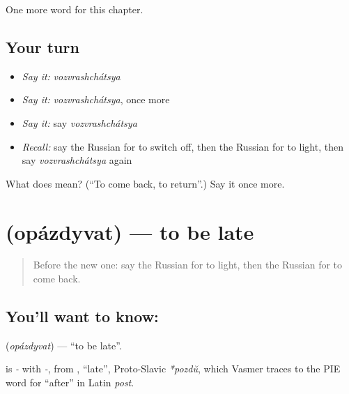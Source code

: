 \begin{grammarlens}[title={What you've built}]
One more word for this chapter.
\end{grammarlens}

\subsection*{Your turn}
\begin{itemize}
\raggedright
  \item \emph{Say it:} \emph{vozvrashchátsya}
  \item \emph{Say it:} \emph{vozvrashchátsya}, once more
  \item \emph{Say it:} say \emph{vozvrashchátsya}
  \item \emph{Recall:} say the Russian for to switch off, then the Russian for to light, then say \emph{vozvrashchátsya} again
\end{itemize}

\begin{tcolorbox}[breakable,colback=teal!4,colframe=teal!35!black,title={Before you move on}]
What does  mean? (\textquotedblleft{}To come back, to return\textquotedblright{}.) Say it once more.
\end{tcolorbox}
\section[\texorpdfstring{\ru{опаздывать} (opázdyvat)}{опаздывать (opázdyvat)}]{ (opázdyvat) — to be late}

\label{lesson:RU-C176-opazdyvat}



\begin{quote}
Before the new one: say the Russian for to light, then the Russian for to come back.
\end{quote}

\subsection*{You'll want to know: }
\textbf{} (\emph{opázdyvat}) — \textquotedblleft{}to be late\textquotedblright{}.

\begin{cousinweb}
\textbf{} is \emph{-} with \emph{-}, from \emph{}, \textquotedblleft{}late\textquotedblright{}, Proto-Slavic \emph{*pozdŭ}, which Vasmer traces to the PIE word for \textquotedblleft{}after\textquotedblright{} in Latin \emph{post}.
\end{cousinweb}

